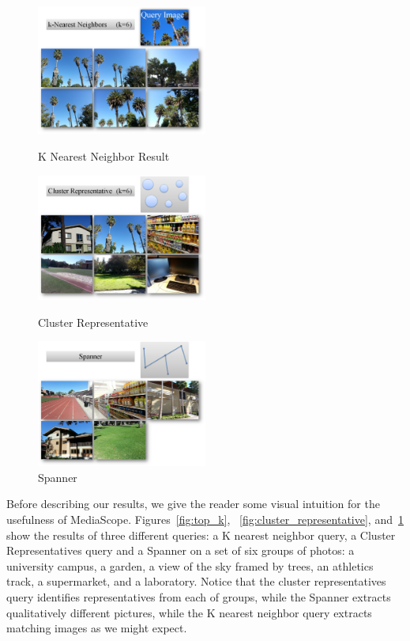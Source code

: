 \begin{figure}
\centering
\begin{minipage}[t]{5.8cm}
\centering
\includegraphics[width = 5.6cm]{pics/1.eps}
\centering \caption{K Nearest Neighbor Result} \label{fig:top_k}
\end{minipage}
\begin{minipage}[t]{5.8cm}
\centering
\includegraphics[width = 5.6cm]{pics/2.eps}
\centering \caption{Cluster Representative} \label{fig:cluster_representative}
\end{minipage}
\begin{minipage}[t]{5.8cm}
\centering
\includegraphics[width = 5.6cm]{pics/3.eps}
\centering \caption{Spanner} \label{fig:spanner}
\end{minipage}
\end{figure}

Before describing our results, we give the reader some visual
intuition for the usefulness of MediaScope.
%
Figures~\ref{fig:top_k}, ~\ref{fig:cluster_representative},
and~\ref{fig:spanner} show the results of three different queries: a K
nearest neighbor query, a Cluster Representatives query and a Spanner
on a set of six groups of photos: a university campus, a garden, a
view of the sky framed by trees, an athletics track, a supermarket,
and a laboratory.
%
Notice that the cluster representatives query identifies
representatives from each of groups, while the Spanner extracts
qualitatively different pictures, while the K nearest neighbor query
extracts matching images as we might expect.
%

